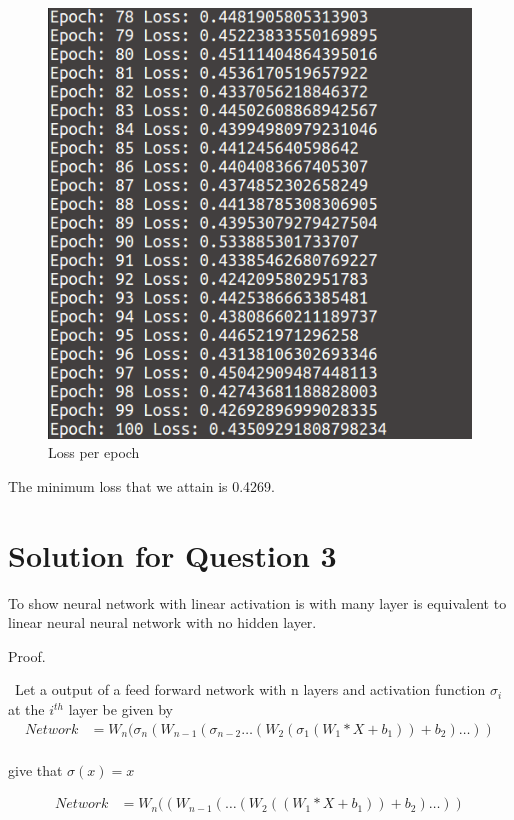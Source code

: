 \documentclass[12pt]{report}
\begin{document}
\begin{figure}[H]
	\centering
	\includegraphics[scale=0.5]{que3_loss}
	\caption{Loss per epoch}
\end{figure}
The minimum loss that we attain is 0.4269.


\chapter{Solution for Question 3}
To show neural network with linear activation is with many layer is equivalent to linear neural neural network with no hidden layer.
\

\noindent Proof.	

\
Let a output of a feed forward network with n layers and activation function $\sigma_i$ at the $i^{th}$ layer be given by 
\begin{equation*} \label{eq1}
	\begin{split}
	Network & = W_n(\sigma_n(W_{n-1}(\sigma_{n-2} \dots (W_2(\sigma_1(W_1*X + b_1) )+b_2) \dots )) \\
	\end{split}
\end{equation*}

give that $\sigma(x) = x$

\begin{equation*}
\begin{split}
Network & = W_n((W_{n-1}(\dots (W_2((W_1*X + b_1) )+b_2) \dots )) \\
\end{split}
\end{equation*}
\end{document}
